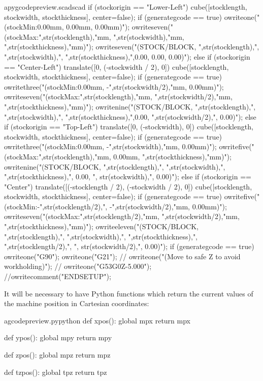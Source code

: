 \documentclass{ltxdoc}
\begin{document}
\begin{writecode}{a}{pygcodepreview.scad}{scad}
{{    if (stockorigin == "Lower-Left") {
    cube([stocklength, stockwidth, stockthickness], center=false);
if (generategcode == true) {
owriteone("(stockMin:0.00mm, 0.00mm, 0.00mm)");
owriteseven("(stockMax:",str(stocklength),"mm, ",str(stockwidth),"mm, ",str(stockthickness),"mm)");
owriteseven("(STOCK/BLOCK, ",str(stocklength),", ",str(stockwidth),", ",str(stockthickness),",0.00, 0.00, 0.00)");
    }
}    else if (stockorigin == "Center-Left") {
    translate([0, (-stockwidth / 2), 0]){
      cube([stocklength, stockwidth, stockthickness], center=false);
if (generategcode == true) {
owritethree("(stockMin:0.00mm, -",str(stockwidth/2),"mm, 0.00mm)");
owriteseven("(stockMax:",str(stocklength),"mm, ",str(stockwidth/2),"mm, ",str(stockthickness),"mm)");
owritenine("(STOCK/BLOCK, ",str(stocklength),", ",str(stockwidth),", ",str(stockthickness),",0.00, ",str(stockwidth/2),", 0.00)");
    }
  } 
    } else if (stockorigin == "Top-Left") {
    translate([0, (-stockwidth), 0]){
      cube([stocklength, stockwidth, stockthickness], center=false);
    }
if (generategcode == true) {
owritethree("(stockMin:0.00mm, -",str(stockwidth),"mm, 0.00mm)");
owritefive("(stockMax:",str(stocklength),"mm, 0.00mm, ",str(stockthickness),"mm)");
owritenine("(STOCK/BLOCK, ",str(stocklength),", ",str(stockwidth),", ",str(stockthickness),", 0.00, ", str(stockwidth),", 0.00)");
  }
}    else if (stockorigin == "Center") {
    translate([(-stocklength / 2), (-stockwidth / 2), 0]){
      cube([stocklength, stockwidth, stockthickness], center=false);
    }
if (generategcode == true) {
owritefive("(stockMin:-",str(stocklength/2),", -",str(stockwidth/2),"mm, 0.00mm)");
owriteseven("(stockMax:",str(stocklength/2),"mm, ",str(stockwidth/2),"mm, ",str(stockthickness),"mm)");
owriteeleven("(STOCK/BLOCK, ",str(stocklength),", ",str(stockwidth),", ",str(stockthickness),", ",str(stocklength/2),", ", str(stockwidth/2),", 0.00)");
    }
  }
}
if (generategcode == true) {
    owriteone("G90");
    owriteone("G21");
//    owriteone("(Move to safe Z to avoid workholding)");
//    owriteone("G53G0Z-5.000");
  }
//owritecomment("ENDSETUP");
}

\end{writecode}
\addtocounter{pyscad}{93}

It will be necessary to have Python functions which return the current values of the 
machine position in Cartesian coordinates: 

\lstset{firstnumber=\thegcpy}
\begin{writecode}{a}{gcodepreview.py}{python}
def xpos():
    global mpx
    return mpx

def ypos():
    global mpy
    return mpy

def zpos():
    global mpz
    return mpz

def tzpos():
    global tpz
    return tpz

\end{writecode}
\addtocounter{gcpy}{16}
\end{document}

